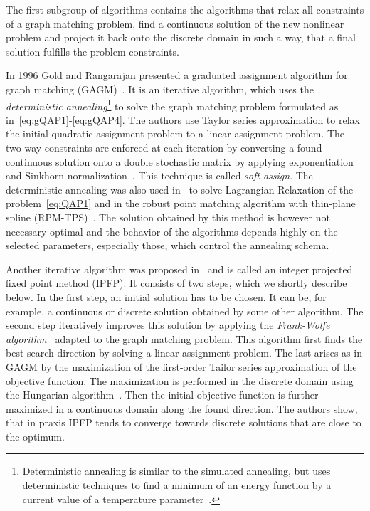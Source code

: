 The first subgroup of algorithms contains the algorithms that relax all constraints of a graph matching problem, find a continuous solution of the new nonlinear problem and project it back onto the discrete domain in such a way, that a final solution fulfills the problem constraints. 

In 1996 Gold and Rangarajan presented a graduated assignment algorithm for graph matching (GAGM)~\cite{Rangarajan1996_GAGM}. It is an iterative algorithm, which uses the \emph{deterministic annealing}\footnote{Deterministic annealing is similar to the simulated annealing, but uses deterministic techniques to find a minimum of an energy function by a current value of a temperature parameter~\cite{Rose1991_DA}.} to solve the graph matching problem formulated as in~\eqref{eq:gQAP1}-\eqref{eq:gQAP4}. The authors use Taylor series approximation to relax the initial quadratic assignment problem to a linear assignment problem. The two-way constraints are enforced at each iteration by converting a  found continuous solution onto a double stochastic matrix by applying exponentiation and Sinkhorn normalization~\cite{Sinkhorn1964}. This technique is called \emph{soft-assign}. The deterministic annealing was also used in~\cite{Rangarajan96_LagRelax} to solve Lagrangian Relaxation of the problem~\eqref{eq:QAP1} and in the robust point matching algorithm with thin-plane spline (RPM-TPS)~\cite{Chui2003}. The solution obtained by this method is however not necessary optimal and the behavior of the algorithms depends highly on the selected parameters, especially those, which control the annealing schema.

Another iterative algorithm was proposed in~\cite{Leordeanu2009_IPFP} and is called an integer projected fixed point method (IPFP). It consists of two steps, which we shortly describe below. In the first step, an initial solution has to be chosen. It can be, for example, a continuous or discrete solution obtained by some other algorithm. The second step iteratively improves this solution by applying the \emph{Frank-Wolfe algorithm}~\cite{Wolfe1956} adapted to the graph matching problem. This algorithm first finds the best search direction by solving a linear assignment problem. The last arises as in GAGM by the maximization of the first-order Tailor series approximation of the objective function. The maximization is performed in the discrete domain using the Hungarian algorithm~\cite{Kuhn1955}. Then the initial objective function is further maximized in a continuous domain along the found direction. The authors show, that in praxis IPFP tends to converge towards discrete solutions that are close to the optimum.

